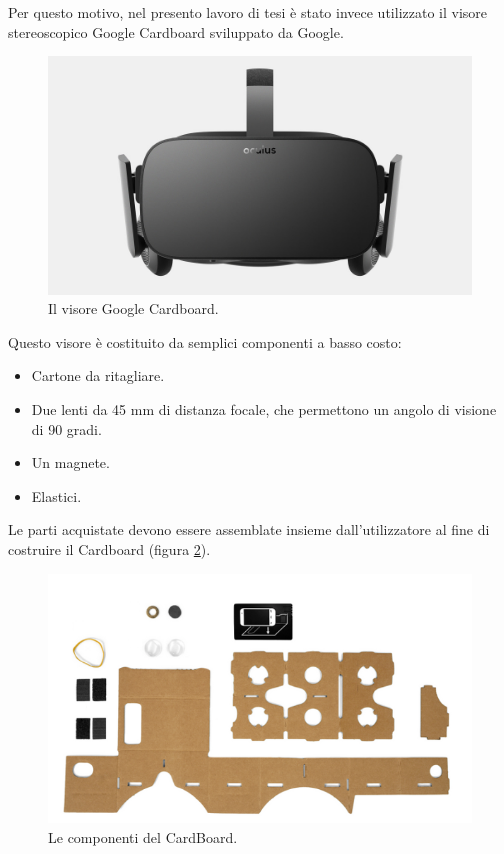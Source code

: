 Per questo motivo, nel presento lavoro di tesi è stato invece utilizzato il visore stereoscopico Google Cardboard sviluppato da Google.
\begin{figure}[htb]
 \centering
 \includegraphics[width=1\linewidth]{images/chapter_navigazione_scena/oculus.jpg}\hfill
 \caption[Il visore Google Cardboard.]{Il visore Google Cardboard.}
 \label{fig:navigazione_scena_navigator_oculus}
\end{figure}
Questo visore è costituito da semplici componenti a basso costo:
\begin{itemize}
\item Cartone da ritagliare.
\item Due lenti da 45 mm di distanza focale, che permettono un angolo di visione di 90 gradi.
\item Un magnete.
\item Elastici.
\end{itemize}
Le parti acquistate devono essere assemblate insieme dall’utilizzatore al fine di costruire il Cardboard (figura \ref{fig:navigazione_scena_navigator_cardboard_pezzi}).
\begin{figure}[htb]
 \centering
 \includegraphics[width=1\linewidth]{images/chapter_navigazione_scena/cardboard_pezzi.png}\hfill
 \caption[Le componenti del CardBoard.]{Le componenti del CardBoard.}
 \label{fig:navigazione_scena_navigator_cardboard_pezzi}
\end{figure}

